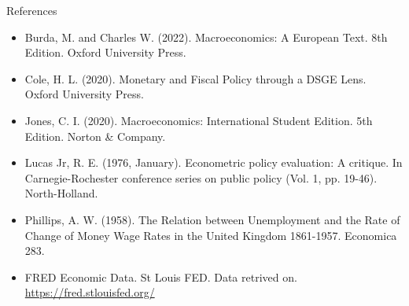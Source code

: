 \documentclass[10pt,c,aspectratio=1610,handout]{beamer}
\begin{document}
\begin{frame}{References}%
  \begin{footnotesize}%
    \begin{itemize}%
      \item[$\blacktriangleright$] Burda, M. and Charles W. (2022). Macroeconomics: A European Text. 8th Edition. Oxford University Press.%
      \item[$\blacktriangleright$] Cole, H. L. (2020). Monetary and Fiscal Policy through a DSGE Lens. Oxford University Press.%
      \item[$\blacktriangleright$] Jones, C. I. (2020). Macroeconomics: International Student Edition. 5th Edition. Norton \& Company.%
      \item[$\blacktriangleright$] Lucas Jr, R. E. (1976, January). Econometric policy evaluation: A critique. In Carnegie-Rochester conference series on public policy (Vol. 1, pp. 19-46). North-Holland.%
      \item[$\blacktriangleright$] Phillips, A. W. (1958). The Relation between Unemployment and the Rate of Change of Money Wage Rates in the United Kingdom 1861-1957. Economica 283.%
      \item[$\blacktriangleright$] FRED Economic Data. St Louis FED. Data retrived on. \href{https://fred.stlouisfed.org/}{https://fred.stlouisfed.org/}%
      \begin{itemize}%
      \end{itemize}%
  \end{itemize}%
  \end{footnotesize}%
\end{frame}%
\end{document}
